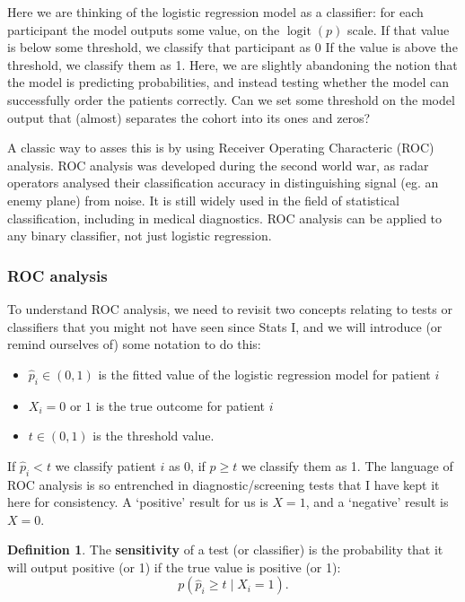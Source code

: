 \documentclass[
  openany]{book}
\providecommand{\tightlist}{%
  \setlength{\itemsep}{0pt}\setlength{\parskip}{0pt}}
\theoremstyle{definition}
\newtheorem{definition}{Definition}[chapter]
\theoremstyle{definition}
\theoremstyle{definition}
\theoremstyle{definition}
\theoremstyle{remark}
\begin{document}
Here we are thinking of the logistic regression model as a classifier: for each participant the model outputs some value, on the \(\operatorname{logit}\left(p\right)\) scale. If that value is below some threshold, we classify that participant as 0 If the value is above the threshold, we classify them as 1. Here, we are slightly abandoning the notion that the model is predicting probabilities, and instead testing whether the model can successfully order the patients correctly. Can we set some threshold on the model output that (almost) separates the cohort into its ones and zeros?

A classic way to asses this is by using Receiver Operating Characteric (ROC) analysis. ROC analysis was developed during the second world war, as radar operators analysed their classification accuracy in distinguishing signal (eg. an enemy plane) from noise. It is still widely used in the field of statistical classification, including in medical diagnostics. ROC analysis can be applied to any binary classifier, not just logistic regression.

\hypertarget{roc-analysis}{%
\subsubsection{ROC analysis}\label{roc-analysis}}

To understand ROC analysis, we need to revisit two concepts relating to tests or classifiers that you might not have seen since Stats I, and we will introduce (or remind ourselves of) some notation to do this:

\begin{itemize}
\tightlist
\item
  \(\hat{p}_i\in\left(0,1\right)\) is the fitted value of the logistic regression model for patient \(i\)
\item
  \(X_i=0\) or \(1\) is the true outcome for patient \(i\)
\item
  \(t\in\left(0,1\right)\) is the threshold value.
\end{itemize}

If \(\hat{p}_i<t\) we classify patient \(i\) as 0, if \(\hat{p}\geq t\) we classify them as 1. The language of ROC analysis is so entrenched in diagnostic/screening tests that I have kept it here for consistency. A `positive' result for us is \(X=1\), and a `negative' result is \(X=0\).

\begin{definition}
The \textbf{sensitivity} of a test (or classifier) is the probability that it will output positive (or 1) if the true value is positive (or 1):
\[p\left(\hat{p}_i \geq t \mid{X_i=1}\right).\]
\end{definition}
\end{document}
